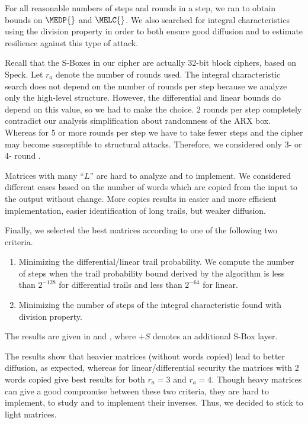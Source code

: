 For all reasonable numbers of steps and rounds in a step, we ran  to obtain bounds on $\MEDP{}$ and $\MELC{}$. We also searched for integral characteristics using the division property in order to both ensure good diffusion and to estimate resilience against this type of attack.

Recall that the S-Boxes in our cipher are actually 32-bit block ciphers, based on Speck. Let $r_a$ denote the number of rounds used. The integral characteristic search does not depend on the number of rounds per step because we analyze only the high-level structure. However, the differential and linear bounds do depend on this value, so we had to make the choice. 2 rounds per step completely contradict our analysis simplification about randomness of the ARX box. Whereas for 5 or more rounds per step we have to take fewer steps and the cipher may become susceptible to structural attacks. Therefore, we considered only 3- or 4- round \speckey{}.

Matrices with many ``$L$'' are hard to analyze and to implement. We considered different cases based on the number of words which are copied from the input to the output without change. More copies results in easier and more efficient implementation, easier identification of long trails, but weaker diffusion.

Finally, we selected the best matrices according to one of the following two criteria.
\begin{enumerate}
    \item Minimizing the differential/linear trail probability. We compute the number of steps when the trail probability bound derived by the algorithm is less than $2^{-128}$ for differential trails and less than $2^{-64}$ for linear.
    \item Minimizing the number of steps of the integral characteristic found with division property.
\end{enumerate}

The results are given in  and , where $+S$ denotes an additional S-Box layer.


The results show that heavier matrices (without words copied) lead to better diffusion, as expected, whereas for linear/differential security the matrices with 2 words copied give best results for both $r_a = 3$ and $r_a = 4$. Though heavy matrices can give a good compromise between these two criteria, they are hard to implement, to study and to implement their inverses. Thus, we decided to stick to light matrices.

